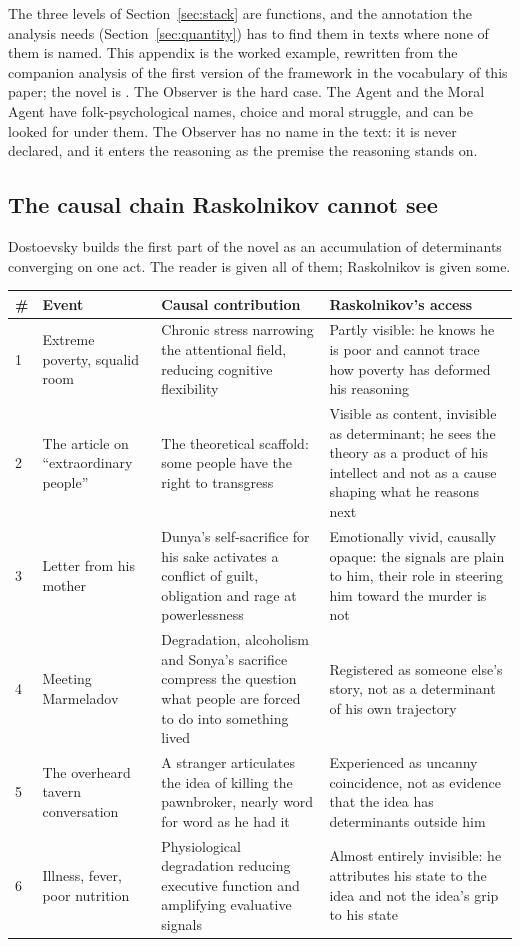 The three levels of Section~\ref{sec:stack} are functions, and the annotation the analysis needs
(Section~\ref{sec:quantity}) has to find them in texts where none of them is named. This appendix is the
worked example, rewritten from the companion analysis of the first version of the framework
\citep{synthea2026} in the vocabulary of this paper; the novel is \citet{dostoevsky1866}. The Observer is
the hard case. The Agent and the Moral Agent have folk-psychological names, choice and moral struggle,
and can be looked for under them. The Observer has no name in the text: it is never declared, and it
enters the reasoning as the premise the reasoning stands on.

\subsection*{The causal chain Raskolnikov cannot see}

Dostoevsky builds the first part of the novel as an accumulation of determinants converging on one act.
The reader is given all of them; Raskolnikov is given some.

\begin{center}\small
\begin{tabular}{@{}p{0.4cm}p{3.2cm}p{5.4cm}p{5.4cm}@{}}
\toprule
\# & Event & Causal contribution & Raskolnikov's access \\
\midrule
1 & Extreme poverty, squalid room & Chronic stress narrowing the attentional field, reducing cognitive flexibility & Partly visible: he knows he is poor and cannot trace how poverty has deformed his reasoning \\
2 & The article on ``extraordinary people'' & The theoretical scaffold: some people have the right to transgress & Visible as content, invisible as determinant; he sees the theory as a product of his intellect and not as a cause shaping what he reasons next \\
3 & Letter from his mother & Dunya's self-sacrifice for his sake activates a conflict of guilt, obligation and rage at powerlessness & Emotionally vivid, causally opaque: the signals are plain to him, their role in steering him toward the murder is not \\
4 & Meeting Marmeladov & Degradation, alcoholism and Sonya's sacrifice compress the question what people are forced to do into something lived & Registered as someone else's story, not as a determinant of his own trajectory \\
5 & The overheard tavern conversation & A stranger articulates the idea of killing the pawnbroker, nearly word for word as he had it & Experienced as uncanny coincidence, not as evidence that the idea has determinants outside him \\
6 & Illness, fever, poor nutrition & Physiological degradation reducing executive function and amplifying evaluative signals & Almost entirely invisible: he attributes his state to the idea and not the idea's grip to his state \\
\bottomrule
\end{tabular}
\end{center}

